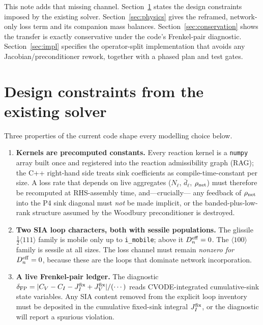\documentclass[11pt,a4paper]{article}
\begin{document}
This note adds that missing channel.  Section~\ref{sec:design} states the
design constraints imposed by the existing solver.  Section~\ref{sec:physics}
gives the reframed, network-only loss term and its companion mass balances.
Section~\ref{sec:conservation} shows the transfer is exactly conservative under
the code's Frenkel-pair diagnostic.  Section~\ref{sec:impl} specifies the
operator-split implementation that avoids any Jacobian/preconditioner rework,
together with a phased plan and test gates.

\section{Design constraints from the existing solver}
\label{sec:design}

Three properties of the current code shape every modelling choice below.

\begin{enumerate}\itemsep2pt
  \item \textbf{Kernels are precomputed constants.}  Every reaction kernel is
        a \texttt{numpy} array built once and registered into the reaction
        admissibility graph (RAG); the C++ right-hand side treats sink
        coefficients as compile-time-constant per size.  A loss rate that
        depends on live aggregates ($N_\ell$, $\bar d_\ell$, $\rho_{\rm net}$)
        must therefore be recomputed at RHS-assembly time, and---crucially---%
        any feedback of $\rho_{\rm net}$ into the P4 sink diagonal must
        \emph{not} be made implicit, or the banded-plus-low-rank structure
        assumed by the Woodbury preconditioner is destroyed.
  \item \textbf{Two SIA loop characters, both with sessile populations.}  The
        glissile $\tfrac12\langle111\rangle$ family is mobile only up to
        \texttt{i\_mobile}; above it $D_n^{\rm eff}=0$.  The
        $\langle100\rangle$ family is sessile at all sizes.  The loss channel
        must remain \emph{nonzero for $D_n^{\rm eff}=0$}, because these are the
        loops that dominate network incorporation.
  \item \textbf{A live Frenkel-pair ledger.}  The diagnostic
        $\delta_{\rm FP}=|C_V-C_I-J^{\rm fix}_{I}+J^{\rm fix}_{V}|/(\cdots)$
        reads CVODE-integrated cumulative-sink state variables.  Any SIA
        content removed from the explicit loop inventory must be deposited in
        the cumulative fixed-sink integral $J^{\rm fix}_{I}$, or the diagnostic
        will report a spurious violation.
\end{enumerate}
\end{document}
